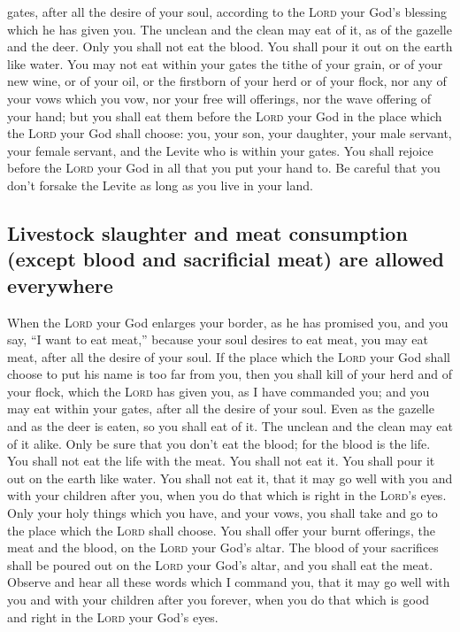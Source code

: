gates, after all the desire of your soul, according to the \textsc{Lord}
your God's blessing which he has given you. The unclean and the clean
may eat of it, as of the gazelle and the deer.  Only you
shall not eat the blood. You shall pour it out on the earth like water.
 You may not eat within your gates the tithe of your
grain, or of your new wine, or of your oil, or the firstborn of your
herd or of your flock, nor any of your vows which you vow, nor your free
will offerings, nor the wave offering of your hand;  but
you shall eat them before the \textsc{Lord} your God in the place which
the \textsc{Lord} your God shall choose: you, your son, your daughter,
your male servant, your female servant, and the Levite who is within
your gates. You shall rejoice before the \textsc{Lord} your God in all
that you put your hand to.  Be careful that you don't
forsake the Levite as long as you live in your land.

\hypertarget{livestock-slaughter-and-meat-consumption-except-blood-and-sacrificial-meat-are-allowed-everywhere}{%
\subsection{Livestock slaughter and meat consumption (except blood and
sacrificial meat) are allowed
everywhere}\label{livestock-slaughter-and-meat-consumption-except-blood-and-sacrificial-meat-are-allowed-everywhere}}

 When the \textsc{Lord} your God enlarges your border, as
he has promised you, and you say, ``I want to eat meat,'' because your
soul desires to eat meat, you may eat meat, after all the desire of your
soul.  If the place which the \textsc{Lord} your God
shall choose to put his name is too far from you, then you shall kill of
your herd and of your flock, which the \textsc{Lord} has given you, as I
have commanded you; and you may eat within your gates, after all the
desire of your soul.  Even as the gazelle and as the deer
is eaten, so you shall eat of it. The unclean and the clean may eat of
it alike.  Only be sure that you don't eat the blood; for
the blood is the life. You shall not eat the life with the meat.
 You shall not eat it. You shall pour it out on the earth
like water.  You shall not eat it, that it may go well
with you and with your children after you, when you do that which is
right in the \textsc{Lord}'s eyes.  Only your holy things
which you have, and your vows, you shall take and go to the place which
the \textsc{Lord} shall choose.  You shall offer your
burnt offerings, the meat and the blood, on the \textsc{Lord} your God's
altar. The blood of your sacrifices shall be poured out on the
\textsc{Lord} your God's altar, and you shall eat the meat.
 Observe and hear all these words which I command you,
that it may go well with you and with your children after you forever,
when you do that which is good and right in the \textsc{Lord} your God's
eyes.

